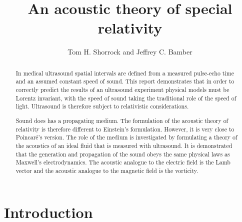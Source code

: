 \documentclass[10pt, fleqn,final,showtrims,oldfontcommands, article,a4paper,oneside]{memoir} %
\newcommand{\Poincare}{Poincar{\'e}}
\begin{document}
\title{An acoustic theory of special relativity}

\author{Tom H. Shorrock and Jeffrey C. Bamber}

\maketitle

\begin{abstract}

In medical ultrasound spatial intervals are defined from a measured pulse-echo time and an  assumed constant speed of sound.
This report demonstrates that in order to correctly predict the results of an ultrasound experiment
physical models must be Lorentz invariant, with the speed of sound taking the traditional  role of the speed of light.
Ultrasound is therefore subject to relativistic considerations.

Sound does has a propagating medium.
The formulation of the acoustic theory of relativity is therefore different to Einstein's formulation.
However, it is very close to \Poincare's version.
The role of the medium is investigated by formulating a theory of the acoustics of an 
ideal fluid that is measured with ultrasound.
It is demonstrated that the generation and propagation of the sound obeys the same physical laws as Maxwell's  electrodynamics.
The acoustic analogue to the electric field is the Lamb vector 
and the acoustic analogue to the magnetic field is the vorticity.


\end{abstract}

\section{Introduction}\label{sec:introduction}
\end{document}
